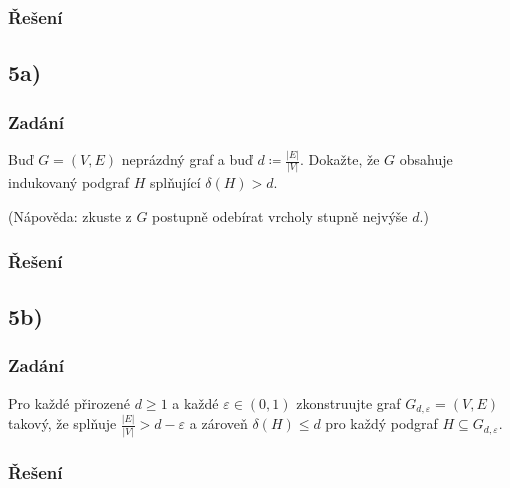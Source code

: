 \documentclass[../main.tex]{subfiles}
\begin{document}
\subsubsection*{Řešení}


\subsection*{5a)}
\subsubsection*{Zadání}
Buď $G=(V,E)$ neprázdný graf a buď $d \coloneq \frac{|E|}{|V|}$. Dokažte, že $G$ obsahuje indukovaný podgraf $H$ splňující $\delta(H) > d$.

(Nápověda: zkuste z $G$ postupně odebírat vrcholy stupně nejvýše $d$.)

\subsubsection*{Řešení}


\subsection*{5b)}
\subsubsection*{Zadání}
Pro každé přirozené $d\geq 1$ a každé $\varepsilon\in(0,1)$ zkonstruujte graf $G_{d,\varepsilon}= (V,E)$
takový, že splňuje $\frac{|E|}{|V|} > d - \varepsilon$ a zároveň $\delta(H)\leq d$ pro každý podgraf $H \subseteq G_{d,\varepsilon}$.


\subsubsection*{Řešení}
\end{document}
